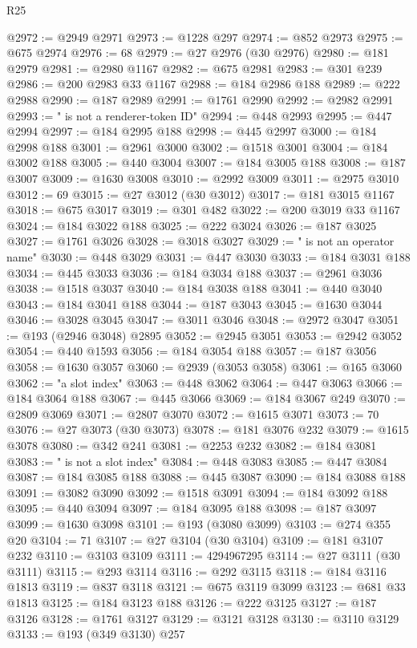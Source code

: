 \begin{lexlean}{R25}
\begin{coremodule}
@2972 := @2949 @2971
@2973 := @1228 @297
@2974 := @852 @2973
@2975 := @675 @2974
@2976 := 68
@2979 := @27 @2976 (@30 @2976)
@2980 := @181 @2979
@2981 := @2980 @1167
@2982 := @675 @2981
@2983 := @301 @239
@2986 := @200 @2983 @33 @1167
@2988 := @184 @2986 @188
@2989 := @222 @2988
@2990 := @187 @2989
@2991 := @1761 @2990
@2992 := @2982 @2991
@2993 := " is not a renderer-token ID"
@2994 := @448 @2993
@2995 := @447 @2994
@2997 := @184 @2995 @188
@2998 := @445 @2997
@3000 := @184 @2998 @188
@3001 := @2961 @3000
@3002 := @1518 @3001
@3004 := @184 @3002 @188
@3005 := @440 @3004
@3007 := @184 @3005 @188
@3008 := @187 @3007
@3009 := @1630 @3008
@3010 := @2992 @3009
@3011 := @2975 @3010
@3012 := 69
@3015 := @27 @3012 (@30 @3012)
@3017 := @181 @3015 @1167
@3018 := @675 @3017
@3019 := @301 @482
@3022 := @200 @3019 @33 @1167
@3024 := @184 @3022 @188
@3025 := @222 @3024
@3026 := @187 @3025
@3027 := @1761 @3026
@3028 := @3018 @3027
@3029 := " is not an operator name"
@3030 := @448 @3029
@3031 := @447 @3030
@3033 := @184 @3031 @188
@3034 := @445 @3033
@3036 := @184 @3034 @188
@3037 := @2961 @3036
@3038 := @1518 @3037
@3040 := @184 @3038 @188
@3041 := @440 @3040
@3043 := @184 @3041 @188
@3044 := @187 @3043
@3045 := @1630 @3044
@3046 := @3028 @3045
@3047 := @3011 @3046
@3048 := @2972 @3047
@3051 := @193 (@2946 @3048) @2895
@3052 := @2945 @3051
@3053 := @2942 @3052
@3054 := @440 @1593
@3056 := @184 @3054 @188
@3057 := @187 @3056
@3058 := @1630 @3057
@3060 := @2939 (@3053 @3058)
@3061 := @165 @3060
@3062 := "a slot index"
@3063 := @448 @3062
@3064 := @447 @3063
@3066 := @184 @3064 @188
@3067 := @445 @3066
@3069 := @184 @3067 @249
@3070 := @2809 @3069
@3071 := @2807 @3070
@3072 := @1615 @3071
@3073 := 70
@3076 := @27 @3073 (@30 @3073)
@3078 := @181 @3076 @232
@3079 := @1615 @3078
@3080 := @342 @241
@3081 := @2253 @232
@3082 := @184 @3081
@3083 := " is not a slot index"
@3084 := @448 @3083
@3085 := @447 @3084
@3087 := @184 @3085 @188
@3088 := @445 @3087
@3090 := @184 @3088 @188
@3091 := @3082 @3090
@3092 := @1518 @3091
@3094 := @184 @3092 @188
@3095 := @440 @3094
@3097 := @184 @3095 @188
@3098 := @187 @3097
@3099 := @1630 @3098
@3101 := @193 (@3080 @3099)
@3103 := @274 @355 @20
@3104 := 71
@3107 := @27 @3104 (@30 @3104)
@3109 := @181 @3107 @232
@3110 := @3103 @3109
@3111 := 4294967295
@3114 := @27 @3111 (@30 @3111)
@3115 := @293 @3114
@3116 := @292 @3115
@3118 := @184 @3116 @1813
@3119 := @837 @3118
@3121 := @675 @3119 @3099
@3123 := @681 @33 @1813
@3125 := @184 @3123 @188
@3126 := @222 @3125
@3127 := @187 @3126
@3128 := @1761 @3127
@3129 := @3121 @3128
@3130 := @3110 @3129
@3133 := @193 (@349 @3130) @257

\end{coremodule}
\end{lexlean}
